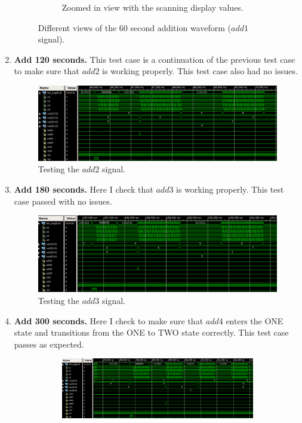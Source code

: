 \documentclass{article}
\begin{document}
\begin{enumerate}
\begin{figure}[H]
\begin{subfigure}{\textwidth}
                \caption{Zoomed in view with the scanning display values.}
            \end{subfigure}
            \caption{Different views of the 60 second addition waveform ($add1$ signal).}
            \label{fig:add1}
        \end{figure}
    \item \textbf{Add 120 seconds.} This test case is a continuation of the previous test case to make sure that $add2$ is working properly. This test case also had no issues.
        \begin{figure}[H]
            \centering
            \includegraphics[scale=0.35]{../figs/add120.png}
            \caption{Testing the $add2$ signal.}
            \label{fig:add2}
        \end{figure}
    \item \textbf{Add 180 seconds.} Here I check that $add3$ is working properly. This test case passed with no issues.
        \begin{figure}[H]
            \centering
            \includegraphics[scale=0.35]{../figs/add180.png}
            \caption{Testing the $add3$ signal.}
            \label{fig:add3}
        \end{figure}
    \item \textbf{Add 300 seconds.} Here I check to make sure that $add4$ enters the ONE state and transitions from the ONE to TWO state correctly. This test case passes as expected.
        \begin{figure}[H]
            \centering
            \begin{subfigure}{\textwidth}
                \centering
                \includegraphics[scale=0.34]{../figs/add300-1.png}

\end{subfigure}
\end{figure}
\end{enumerate}
\end{document}
